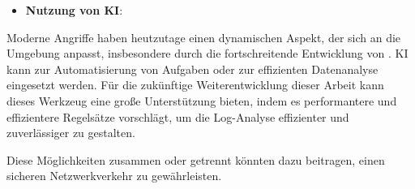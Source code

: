 \begin{itemize}[noitemsep]
    \item \textbf{Nutzung von \gls{KI}}:
\end{itemize}

Moderne Angriffe haben heutzutage einen dynamischen Aspekt, der sich an die Umgebung anpasst, insbesondere durch die fortschreitende Entwicklung von  \citep{Guembe_AIHACKER}. \gls{KI} kann zur Automatisierung von Aufgaben oder zur effizienten Datenanalyse eingesetzt werden. Für die zukünftige Weiterentwicklung dieser Arbeit kann dieses Werkzeug eine große Unterstützung bieten, indem es performantere und effizientere Regelsätze vorschlägt, um die Log-Analyse effizienter und zuverlässiger zu gestalten. 

Diese Möglichkeiten zusammen oder getrennt könnten dazu beitragen, einen sicheren Netzwerkverkehr zu gewährleisten.